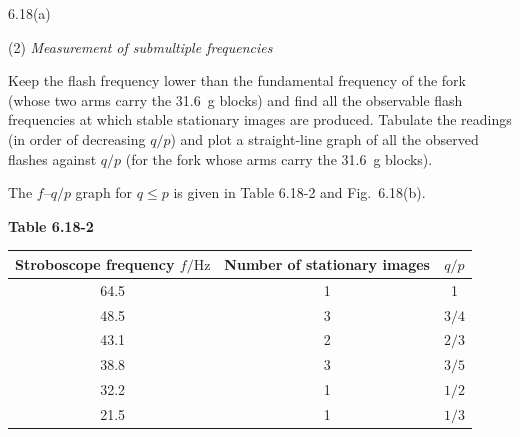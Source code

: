 \begin{figbox}{6.18(a)}
\end{figbox}

(2) \textit{Measurement of submultiple frequencies}

Keep the flash frequency lower than the fundamental frequency of the fork (whose two arms carry the \SI{31.6}{g} blocks) and find all the observable flash frequencies at which stable stationary images are produced. Tabulate the readings (in order of decreasing $q/p$) and plot a straight-line graph of all the observed flashes against $q/p$ (for the fork whose arms carry the \SI{31.6}{g} blocks).

The $f$--$q/p$ graph for $q\le p$ is given in Table 6.18-2 and Fig.~6.18(b).

\begin{center}
\begin{minipage}{\linewidth}
\centering
\textbf{Table 6.18-2}\\[3pt]
\begin{tabular}{ccc}
\toprule
Stroboscope frequency $f/\mathrm{Hz}$ & Number of stationary images & $q/p$\\
\midrule
64.5 & 1 & 1\\
48.5 & 3 & $3/4$\\
43.1 & 2 & $2/3$\\
38.8 & 3 & $3/5$\\
32.2 & 1 & $1/2$\\
21.5 & 1 & $1/3$\\
\bottomrule
\end{tabular}
\end{minipage}
\end{center}

